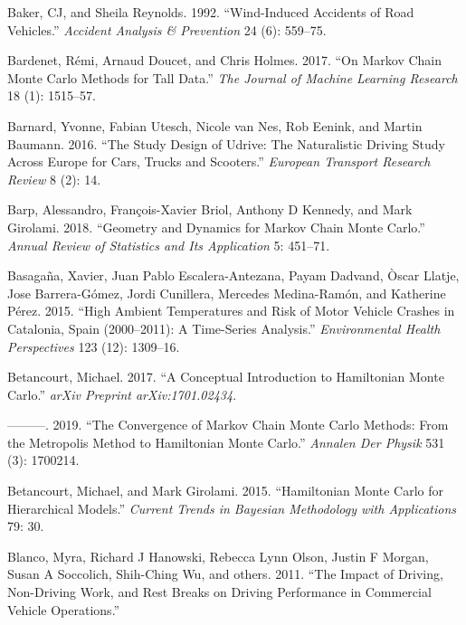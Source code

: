 \documentclass[12pt]{book}
\numberwithin{equation}{chapter}
\begin{document}
\leavevmode\hypertarget{ref-baker1992wind}{}%
Baker, CJ, and Sheila Reynolds. 1992. ``Wind-Induced Accidents of Road Vehicles.'' \emph{Accident Analysis \& Prevention} 24 (6): 559--75.

\leavevmode\hypertarget{ref-bardenet2017markov}{}%
Bardenet, Rémi, Arnaud Doucet, and Chris Holmes. 2017. ``On Markov Chain Monte Carlo Methods for Tall Data.'' \emph{The Journal of Machine Learning Research} 18 (1): 1515--57.

\leavevmode\hypertarget{ref-barnard2016study}{}%
Barnard, Yvonne, Fabian Utesch, Nicole van Nes, Rob Eenink, and Martin Baumann. 2016. ``The Study Design of Udrive: The Naturalistic Driving Study Across Europe for Cars, Trucks and Scooters.'' \emph{European Transport Research Review} 8 (2): 14.

\leavevmode\hypertarget{ref-barp2018geometry}{}%
Barp, Alessandro, François-Xavier Briol, Anthony D Kennedy, and Mark Girolami. 2018. ``Geometry and Dynamics for Markov Chain Monte Carlo.'' \emph{Annual Review of Statistics and Its Application} 5: 451--71.

\leavevmode\hypertarget{ref-basagana2015high}{}%
Basagaña, Xavier, Juan Pablo Escalera-Antezana, Payam Dadvand, Òscar Llatje, Jose Barrera-Gómez, Jordi Cunillera, Mercedes Medina-Ramón, and Katherine Pérez. 2015. ``High Ambient Temperatures and Risk of Motor Vehicle Crashes in Catalonia, Spain (2000--2011): A Time-Series Analysis.'' \emph{Environmental Health Perspectives} 123 (12): 1309--16.

\leavevmode\hypertarget{ref-betancourt2017conceptual}{}%
Betancourt, Michael. 2017. ``A Conceptual Introduction to Hamiltonian Monte Carlo.'' \emph{arXiv Preprint arXiv:1701.02434}.

\leavevmode\hypertarget{ref-betancourt2019convergence}{}%
---------. 2019. ``The Convergence of Markov Chain Monte Carlo Methods: From the Metropolis Method to Hamiltonian Monte Carlo.'' \emph{Annalen Der Physik} 531 (3): 1700214.

\leavevmode\hypertarget{ref-betancourt2015hamiltonian}{}%
Betancourt, Michael, and Mark Girolami. 2015. ``Hamiltonian Monte Carlo for Hierarchical Models.'' \emph{Current Trends in Bayesian Methodology with Applications} 79: 30.

\leavevmode\hypertarget{ref-blanco2011impact}{}%
Blanco, Myra, Richard J Hanowski, Rebecca Lynn Olson, Justin F Morgan, Susan A Soccolich, Shih-Ching Wu, and others. 2011. ``The Impact of Driving, Non-Driving Work, and Rest Breaks on Driving Performance in Commercial Vehicle Operations.''
\end{document}
